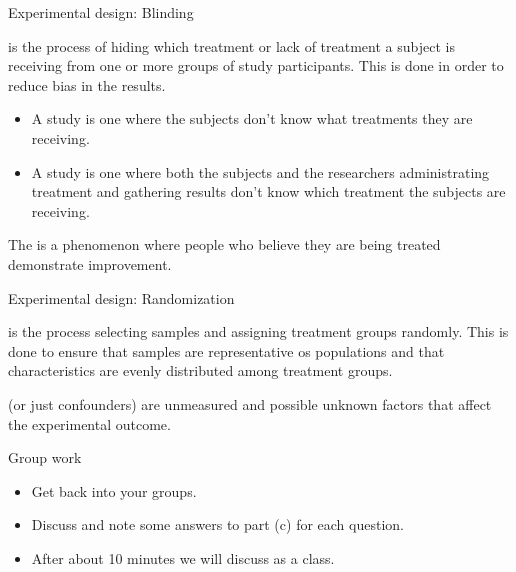 \documentclass[xcolor=table]{beamer}
\begin{document}
\begin{frame}{Experimental design: Blinding}
\begin{block}{}
\large
{} is the process of hiding which treatment or lack of treatment a subject is receiving from one or more groups of study participants. This is done in order to reduce bias in the results.

\begin{itemize}
\pause\item A  study is one where the subjects don't know what treatments they are receiving.

\pause\item A  study is one where both the subjects and the researchers administrating treatment and gathering results don't know which treatment the subjects are receiving.
\end{itemize}
\end{block}

\pause
\begin{block}{}
\large
The  is a phenomenon where people who believe they are being treated demonstrate improvement.
\end{block}
\end{frame}

\begin{frame}{Experimental design: Randomization}

\begin{block}{}
\large
{} is the process selecting samples and assigning treatment groups randomly. This is done to ensure that samples are representative os populations and that characteristics are evenly distributed among treatment groups.
\end{block}

\pause
\begin{block}{}
\large
{} (or just confounders) are unmeasured and possible unknown factors that affect the experimental outcome. 
\end{block}
\end{frame}

\begin{frame}{Group work}
\begin{block}{}
\large
\begin{itemize}
\item Get back into your groups.
\item Discuss and note some answers to part (c) for each question.
\item After about 10 minutes we will discuss as a class. 
\end{itemize}
\end{block}
\end{frame}
\end{document}
